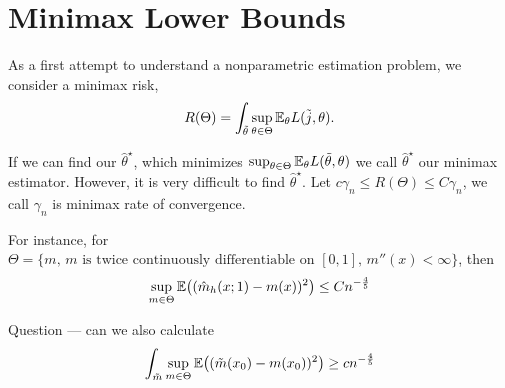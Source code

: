 
\chapter{Minimax Lower Bounds}
\label{cha:minimax-lower-bounds}

As a first attempt to understand a nonparametric estimation problem,
we consider a minimax risk,
\begin{equation}
  \label{eq:105}
  R(\Theta) = \int_{\tilde \theta} \sup_{\theta \in \Theta}
  \E_{\theta} L(\tilde j, \theta).
\end{equation}

If we can find our $\hat \theta^{\star}$, which minimizes
$\sup_{\theta \in \Theta} \E_{\theta} L(\tilde \theta, \theta)$ we
call $\hat \theta^{\star}$ our minimax estimator. However, it is very
difficult to find $\hat \theta^{\star}$. Let $c \gamma_{n} \leq
R(\Theta) \leq C \gamma_{n}$, we call $\gamma_{n}$ is minimax rate of
convergence.

For instance, for $\Theta = \{ \text{$m$, $m$ is twice continuously
  differentiable on $[0, 1]$, $m''(x) < \infty$} \}$, then
\begin{equation}
  \label{eq:106}
  \sup_{m \in \Theta} \E{(\hat m_{h}(x; 1) - m(x))^{2}} \leq C n^{-\frac{4}{5}}
\end{equation}

Question --- can we also calculate
\begin{equation}
  \label{eq:107}
  \int_{\tilde m} \sup_{m \in \Theta} \E{(\tilde m(x_{0}) - m(x_{0}))^{2}} \geq cn^{-\frac{4}{5}}
\end{equation}

